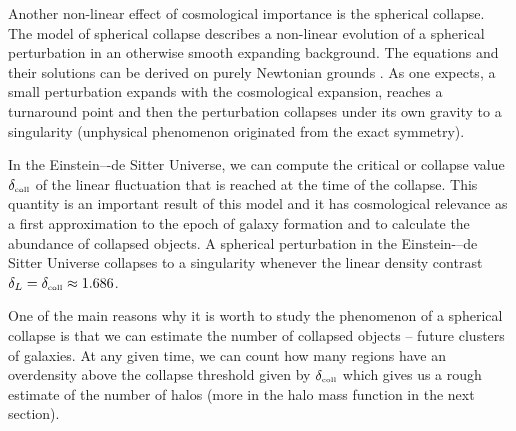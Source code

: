 Another non-linear effect of cosmological importance is the spherical collapse. The model of spherical collapse describes a non-linear evolution of a spherical perturbation in an otherwise smooth expanding background. The equations and their solutions can be derived on purely Newtonian grounds \parencite{2010deto.book.....A}. As one expects, a small perturbation expands with the cosmological expansion, reaches a turnaround point and then the perturbation collapses under its own gravity to a singularity (unphysical phenomenon originated from the exact symmetry).

In the Einstein–-de Sitter Universe, we can compute the critical or collapse value $\delta_\text{\tiny coll}$ of the linear fluctuation that is reached at the time of the collapse. This quantity is an important result of this model and it has cosmological relevance as a first approximation to the epoch of galaxy formation and to calculate the abundance of collapsed objects. A spherical perturbation in the Einstein-–de Sitter Universe collapses to a singularity whenever the linear density contrast $\delta_L=\delta_\text{\tiny coll}\approx1.686$.

One of the main reasons why it is worth to study the phenomenon of a spherical collapse is that we can estimate the number of collapsed objects -- future clusters of galaxies. At any given time, we can count how many regions have an overdensity above the collapse threshold given by $\delta_\text{\tiny coll}$ which gives us a rough estimate of the number of halos (more in the halo mass function in the next section).
